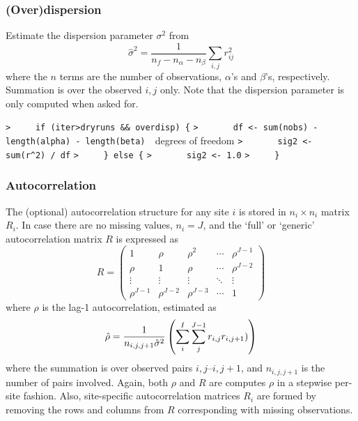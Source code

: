 \documentclass[a4paper]{article}
\begin{document}
\subsubsection{(Over)dispersion}
Estimate the dispersion parameter $\sigma^2$ from
\begin{equation}
  \hat{\sigma}^2 = \frac{1}{n_f - n_\alpha - n_\beta} \sum_{i,j} r_{ij}^2
\end{equation}
where the $n$ terms are the number of observations, $\alpha$'s and $\beta$'s, respectively.
Summation is over the observed $i,j$ only.
Note that the dispersion parameter is only computed when asked for.\par
\verb~>     if (iter>dryruns && overdisp) {~\newline
\verb~>       df <- sum(nobs) - length(alpha) - length(beta)  ~{\sffamily degrees of freedom}\newline
\verb~>       sig2 <- sum(r^2) / df~\newline
\verb~>     } else {~\newline
\verb~>       sig2 <- 1.0~\newline
\verb~>     }~\par



\subsubsection{Autocorrelation}
The (optional) autocorrelation structure for any site $i$ is stored in $n_i\times n_i$ matrix $R_i$.
In case there are no missing values, $n_i=J$, and the `full' or `generic' autocorrelation matrix $R$ is expressed
as
\begin{equation}
R = \begin{pmatrix}
  1          & \rho       & \rho^2     & \cdots & \rho^{J-1} \\
  \rho       & 1          & \rho       & \cdots & \rho^{J-2} \\
  \vdots     & \vdots     & \vdots     & \ddots & \vdots     \\
  \rho^{J-1} & \rho^{J-2} & \rho^{J-3} & \cdots & 1
  \end{pmatrix}
\end{equation}
where $\rho$ is the lag-1 autocorrelation, estimated as
\begin{equation}
  \hat{\rho} = \frac{1}{n_{i,j,j+1}\hat{\sigma}^2} \left(\sum_i^I\sum_j^{J-1} r_{i,j}r_{i,j+1}) \right)
\end{equation}
where the summation is over observed pairs $i,j$--$i,j+1$, and $n_{i,j,j+1}$ is the number of pairs involved.
Again, both $\rho$ and $R$ are computes $\rho$ in a stepwise per-site fashion.
Also, site-specific autocorrelation matrices $R_i$ are formed by removing the rows and columns from $R$
corresponding with missing observations.\par
\end{document}
